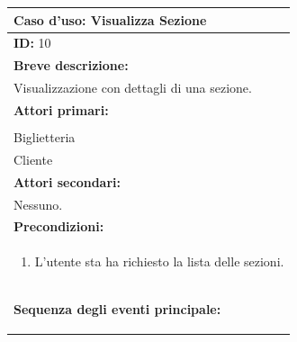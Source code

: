 \documentclass{article}
\begin{document}
                \begin{table}[H]
                    \begin{tabular}{|p{\linewidth}|}
                        \hline
                        \cellcolor{gray!100}
                        \color{white}
                        \centerline{\textbf{Caso d'uso:} Visualizza Sezione} \\
                        \hline
                        \textbf{ID:} 10 \\
                        \hline
                        \cellcolor{gray!20}
                        \textbf{Breve descrizione:} \\
                        \cellcolor{gray!20}
                        Visualizzazione con dettagli di una sezione. \\
                        \hline
                        \textbf{Attori primari:} \\
                        \begin{minipage}{\linewidth}
                            Amministratore \\
                            Biglietteria \\
                            Cliente
                        \end{minipage}
                        \vspace{0pt} \\ 
                        \hline
                        \textbf{Attori secondari:} \\
                        Nessuno. \\
                        \hline
                        \cellcolor{gray!20}
                        \textbf{Precondizioni:} \\
                        \cellcolor{gray!20}
                        \begin{minipage}{\linewidth}
                            \begin{enumerate}
                                \item L'utente sta ha richiesto la lista delle sezioni.
                            \end{enumerate}
                        \end{minipage} \\
                        \hline
                        \textbf{Sequenza degli eventi principale:}
                        \begin{enumerate}

\end{enumerate}
\end{tabular}
\end{table}
\end{document}
